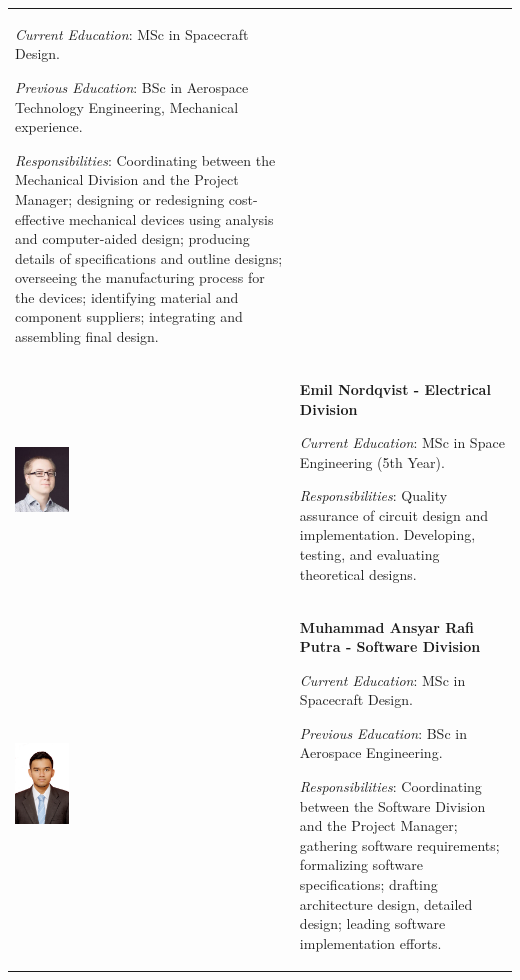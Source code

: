 \documentclass[a4paper,12pt,oneside]{article}
\begin{document}
\begin{longtable}[]{m{} m{}}
\smallskip
\textit{Current Education}: MSc in Spacecraft Design.

\smallskip
\textit{Previous Education}: BSc in Aerospace Technology Engineering, Mechanical experience.

\smallskip
\textit{Responsibilities}: Coordinating between the Mechanical Division and the Project Manager; designing or redesigning cost-effective mechanical devices using analysis and computer-aided design; producing details of specifications and outline designs; overseeing the manufacturing process for the devices; identifying material and component suppliers; integrating and assembling final design.   \bigskip
\\


\includegraphics[width=0.2\textwidth]{1-introduction/img/emil-nordqvist.jpg} & \textbf{Emil Nordqvist - Electrical Division}

\smallskip
\textit{Current Education}: MSc in Space Engineering (5th Year).

\smallskip
\textit{Responsibilities}: Quality assurance of circuit design and implementation. Developing, testing, and evaluating theoretical designs.  \bigskip
\\

\includegraphics[width=0.2\textwidth]{1-introduction/img/muhammad-ansyar-rafi-putra.jpg} & \textbf{Muhammad Ansyar Rafi Putra - Software Division}

\smallskip
\textit{Current Education}: MSc in Spacecraft Design.

\smallskip
\textit{Previous Education}: BSc in Aerospace Engineering.


\smallskip 
\textit{Responsibilities}: Coordinating between the Software Division and the Project Manager; gathering software requirements; formalizing software specifications; drafting architecture design, detailed design; leading software implementation efforts.
\bigskip
\\


\end{longtable}
\end{document}
